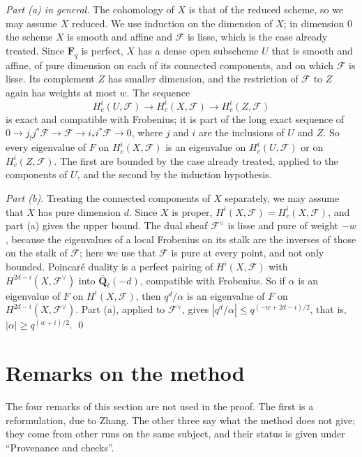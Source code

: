 \documentclass[11pt,a4paper]{article}
\theoremstyle{plain}
\theoremstyle{remark}
\newcommand{\Fq}{\mathbf F_q}
\newcommand{\Ql}{\overline{\mathbf Q}_\ell}
\newcommand{\F}{\mathcal F}
\begin{document}
\medskip\noindent\emph{Part (a) in general.} The cohomology of $X$ is that of the reduced scheme, so we may assume
$X$ reduced. We use induction on the dimension of $X$; in dimension $0$ the scheme $X$ is smooth and affine and
$\F$ is lisse, which is the case already treated. Since $\Fq$ is perfect, $X$ has a dense open subscheme $U$ that is
smooth and affine, of pure dimension on each of its connected components, and on which $\F$ is lisse. Its complement
$Z$ has smaller dimension, and the restriction of $\F$ to $Z$ again has weights at most $w$. The sequence
\[
H^i_c(U,\F)\longrightarrow H^i_c(X,\F)\longrightarrow H^i_c(Z,\F)
\]
is exact and compatible with Frobenius; it is part of the long exact sequence of
$0\to j_!j^*\F\to\F\to i_*i^*\F\to0$, where $j$ and $i$ are the inclusions of $U$ and $Z$. So every eigenvalue of
$F$ on $H^i_c(X,\F)$ is an eigenvalue on $H^i_c(U,\F)$ or on $H^i_c(Z,\F)$. The first are bounded by the case
already treated, applied to the components of $U$, and the second by the induction hypothesis.

\medskip\noindent\emph{Part (b).} Treating the connected components of $X$ separately, we may assume that $X$ has
pure dimension $d$. Since $X$ is proper, $H^i(X,\F)=H^i_c(X,\F)$, and part (a) gives the upper bound. The dual sheaf
$\F^\vee$ is lisse and pure of weight $-w$, because the eigenvalues of a local Frobenius on its stalk are the
inverses of those on the stalk of $\F$; here we use that $\F$ is pure at every point, and not only bounded.
Poincar\'e duality is a perfect pairing of $H^i(X,\F)$ with $H^{2d-i}(X,\F^\vee)$ into $\Ql(-d)$, compatible with
Frobenius. So if $\alpha$ is an eigenvalue of $F$ on $H^i(X,\F)$, then $q^d/\alpha$ is an eigenvalue of $F$ on
$H^{2d-i}(X,\F^\vee)$. Part (a), applied to $\F^\vee$, gives $|q^d/\alpha|\le q^{(-w+2d-i)/2}$, that is,
$|\alpha|\ge q^{(w+i)/2}$. \qed

\section{Remarks on the method}\label{sec:remarks}

The four remarks of this section are not used in the proof. The first is a reformulation, due to Zhang. The other
three say what the method does not give; they come from other runs on the same subject, and their status is given
under ``Provenance and checks''.
\end{document}

